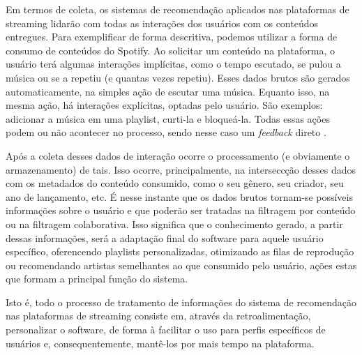 \documentclass[conference]{IEEEtran}
\begin{document}
Em termos de coleta, os sistemas de recomendação aplicados nas plataformas de streaming lidarão com todas as interações dos usuários com os conteúdos entregues. Para exemplificar de forma descritiva, podemos utilizar a forma de consumo de conteúdos do Spotify. Ao solicitar um conteúdo na plataforma, o usuário terá algumas interações implícitas, como o tempo escutado, se pulou a música ou se a repetiu (e quantas vezes repetiu). Esses dados brutos são gerados automaticamente, na simples ação de escutar uma música. Equanto isso, na mesma ação, há interações explícitas, optadas pelo usuário. São exemplos: adicionar a música em uma playlist, curti-la e bloqueá-la. Todas essas ações podem ou não acontecer no processo, sendo nesse caso um \textit{feedback} direto \cite{b9}. 

Após a coleta desses dados de interação ocorre o processamento (e obviamente o armazenamento) de tais. Isso ocorre, principalmente, na interseccção desses dados com os metadados do conteúdo consumido, como o seu gênero, seu criador, seu ano de lançamento, etc. É nesse instante que os dados brutos tornam-se possíveis informações sobre o usuário e que poderão ser tratadas na filtragem por conteúdo ou na filtragem colaborativa. Isso significa que o conhecimento gerado, a partir dessas informações, será a adaptação final do software para aquele usuário específico, oferencendo playlists personalizadas, otimizando as filas de reprodução ou recomendando artistas semelhantes ao que consumido pelo usuário, ações estas que formam a principal função do sistema.

Isto é, todo o processo de tratamento de informações do sistema de recomendação nas plataformas de streaming consiste em, através da retroalimentação, personalizar o software, de forma à facilitar o uso para perfis específicos de usuários e, consequentemente, mantê-los por mais tempo na plataforma.
\end{document}
